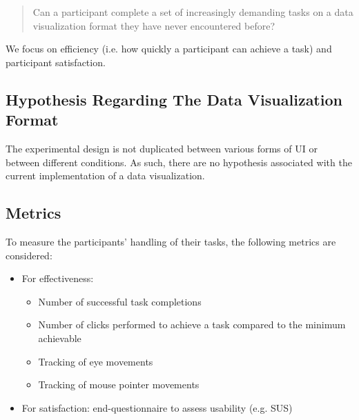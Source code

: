 \documentclass[twocolumn, letterpaper,13pt]{scrartcl}
\begin{document}
    \begin{quote}
        Can a participant complete a set of increasingly demanding tasks on a data visualization format they have never encountered before?
    \end{quote}
    
    We focus on efficiency (i.e. how quickly a participant can achieve a task) and participant satisfaction.

    \subsection*{Hypothesis Regarding The Data Visualization Format}
 
    The experimental design is not duplicated between various forms of UI or between different conditions. As such, there are no hypothesis associated with the current implementation of a data visualization.
 
    \subsection*{Metrics}
    
    To measure the participants' handling of their tasks, the following metrics are considered:
    
    \begin{itemize}
        \item For effectiveness: 
        \begin{itemize}
            \item Number of successful task completions
            \item Number of clicks performed to achieve a task compared to the minimum achievable
            \item Tracking of eye movements
            \item Tracking of mouse pointer movements
        \end{itemize}
        \item For satisfaction: end-questionnaire to assess usability (e.g. SUS)
    \end{itemize}
    
\end{document}
